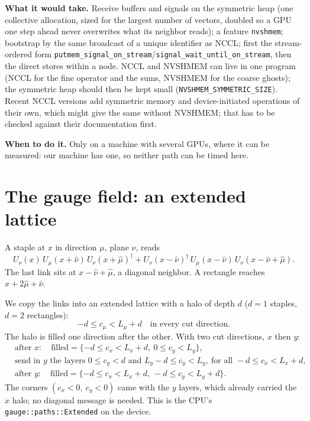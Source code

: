 \documentclass[11pt,a4paper]{article}
\numberwithin{equation}{section}
\newcommand{\code}[1]{\texttt{\small #1}}
\newcommand{\dg}{^{\dagger}}
\begin{document}
\textbf{What it would take.} Receive buffers and signals on the symmetric heap (one collective
allocation, sized for the largest number of vectors, doubled so a GPU one step ahead never
overwrites what its neighbor reads); a feature \code{nvshmem}; bootstrap by the same broadcast of a
unique identifier as NCCL; first the stream-ordered form
\code{putmem\_signal\_on\_stream}/\code{signal\_wait\_until\_on\_stream}, then the direct stores within
a node. NCCL and NVSHMEM can live in one program (NCCL for the fine operator and the sums, NVSHMEM
for the coarse ghosts); the symmetric heap should then be kept small
(\code{NVSHMEM\_SYMMETRIC\_SIZE}). Recent NCCL versions add symmetric memory and device-initiated
operations of their own, which might give the same without NVSHMEM; that has to be checked against
their documentation first.

\textbf{When to do it.} Only on a machine with several GPUs, where it can be measured: our machine
has one, so neither path can be timed here.

\section{The gauge field: an extended lattice}

A staple at $x$ in direction $\mu$, plane $\nu$, reads
\begin{equation}
U_\nu(x)\,U_\mu(x+\hat\nu)\,U_\nu(x+\hat\mu)\dg + U_\nu(x-\hat\nu)\dg\,U_\mu(x-\hat\nu)\,U_\nu(x-\hat\nu+\hat\mu).
\end{equation}
The last link sits at $x-\hat\nu+\hat\mu$, a diagonal neighbor. A rectangle reaches
$x+2\hat\mu+\hat\nu$.

We copy the links into an extended lattice with a halo of depth $d$ ($d=1$ staples, $d=2$
rectangles):
\begin{equation}
-d \le c_\mu < L_\mu + d\quad\text{in every cut direction.}
\end{equation}
The halo is filled one direction after the other. With two cut directions, $x$ then $y$:
\begin{align*}
&\text{after }x:\quad \text{filled}=\{-d\le c_x<L_x+d,\ 0\le c_y<L_y\},\\
&\text{send in }y\text{ the layers }0\le c_y<d\text{ and }L_y-d\le c_y<L_y,\ \text{for all }-d\le c_x<L_x+d,\\
&\text{after }y:\quad \text{filled}=\{-d\le c_x<L_x+d,\ -d\le c_y<L_y+d\}.
\end{align*}
The corners $(c_x<0,\ c_y<0)$ came with the $y$ layers, which already carried the $x$ halo; no
diagonal message is needed. This is the CPU's \code{gauge::paths::Extended} on the device.
\end{document}
